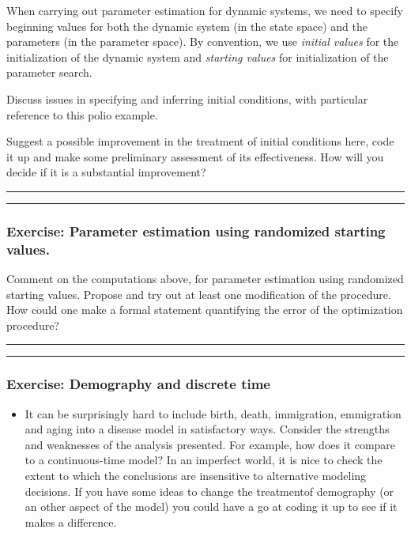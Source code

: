 \documentclass[]{article}
\providecommand{\tightlist}{%
  \setlength{\itemsep}{0pt}\setlength{\parskip}{0pt}}
\begin{document}
When carrying out parameter estimation for dynamic systems, we need to
specify beginning values for both the dynamic system (in the state
space) and the parameters (in the parameter space). By convention, we
use \emph{initial values} for the initialization of the dynamic system
and \emph{starting values} for initialization of the parameter search.

Discuss issues in specifying and inferring initial conditions, with
particular reference to this polio example.

Suggest a possible improvement in the treatment of initial conditions
here, code it up and make some preliminary assessment of its
effectiveness. How will you decide if it is a substantial improvement?

\begin{center}\rule{0.5\linewidth}{\linethickness}\end{center}

\begin{center}\rule{0.5\linewidth}{\linethickness}\end{center}

\subsubsection{Exercise: Parameter estimation using randomized starting
values.}\label{exercise-parameter-estimation-using-randomized-starting-values.}

Comment on the computations above, for parameter estimation using
randomized starting values. Propose and try out at least one
modification of the procedure. How could one make a formal statement
quantifying the error of the optimization procedure?

\begin{center}\rule{0.5\linewidth}{\linethickness}\end{center}

\begin{center}\rule{0.5\linewidth}{\linethickness}\end{center}

\subsubsection{Exercise: Demography and discrete
time}\label{exercise-demography-and-discrete-time}

\begin{itemize}
\tightlist
\item
  It can be surprisingly hard to include birth, death, immigration,
  emmigration and aging into a disease model in satisfactory ways.
  Consider the strengths and weaknesses of the analysis presented. For
  example, how does it compare to a continuous-time model? In an
  imperfect world, it is nice to check the extent to which the
  conclusions are insensitive to alternative modeling decisions. If you
  have some ideas to change the treatmentof demography (or an other
  aspect of the model) you could have a go at coding it up to see if it
  makes a difference.
\end{itemize}
\end{document}
